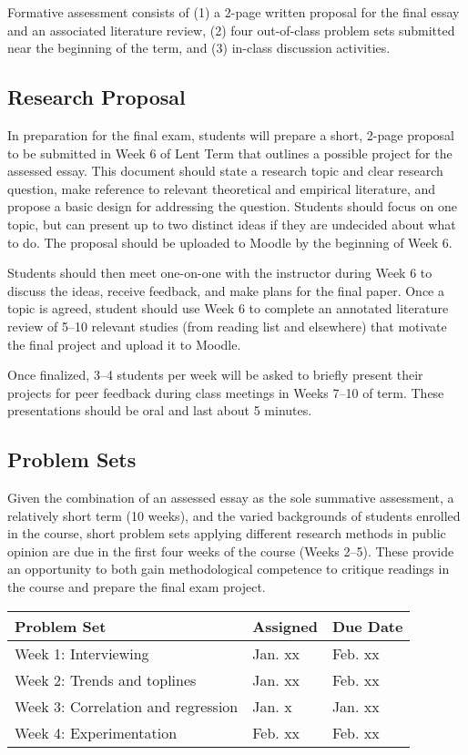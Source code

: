 \documentclass[12pt,a4paper]{article}
\begin{document}
Formative assessment consists of (1) a 2-page written proposal for the final essay and an associated literature review, (2) four out-of-class problem sets submitted near the beginning of the term, and (3) in-class discussion activities.

\subsection{Research Proposal}

In preparation for the final exam, students will prepare a short, 2-page proposal to be submitted in Week 6 of Lent Term that outlines a possible project for the assessed essay. This document should state a research topic and clear research question, make reference to relevant theoretical and empirical literature, and propose a basic design for addressing the question. Students should focus on one topic, but can present up to two distinct ideas if they are undecided about what to do. The proposal should be uploaded to Moodle by the beginning of Week 6.

Students should then meet one-on-one with the instructor during Week 6 to discuss the ideas, receive feedback, and make plans for the final paper. Once a topic is agreed, student should use Week 6 to complete an annotated literature review of 5--10 relevant studies (from reading list and elsewhere) that motivate the final project and upload it to Moodle.

Once finalized, 3--4 students per week will be asked to briefly present their projects for peer feedback during class meetings in Weeks 7--10 of term. These presentations should be oral and last about 5 minutes.

\subsection{Problem Sets}

Given the combination of an assessed essay as the sole summative assessment, a relatively short term (10 weeks), and the varied backgrounds of students enrolled in the course, short problem sets applying different research methods in public opinion are due in the first four weeks of the course (Weeks 2--5). These provide an opportunity to both gain methodological competence to critique readings in the course and prepare the final exam project.

\begin{center}
\begin{tabular}{lll} \hline
\textbf{Problem Set} & \textbf{Assigned} & \textbf{Due Date} \\ \hline
Week 1: Interviewing & Jan. xx & Feb. xx \\
Week 2: Trends and toplines & Jan. xx & Feb. xx \\
Week 3: Correlation and regression & Jan. x & Jan. xx \\
Week 4: Experimentation & Feb. xx & Feb. xx \\ \hline
\end{tabular}
\end{center}
\end{document}
